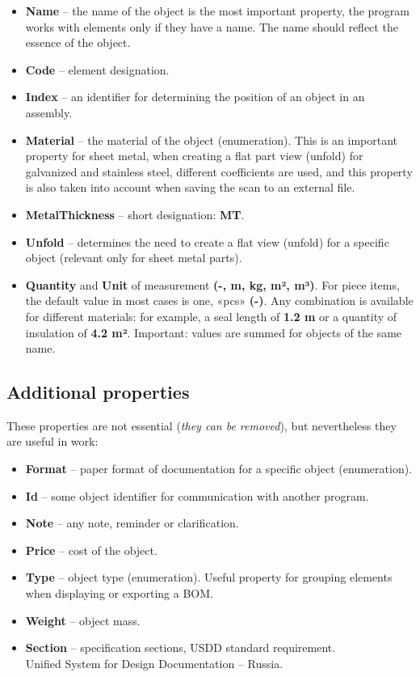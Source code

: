 \documentclass[a4paper,12pt]{article}
\begin{document}
\begin{itemize}
	\item \textbf{Name} -- the name of the object is the most important property, the program works with elements only if they have a name. The name should reflect the essence of the object.
	\item \textbf{Code} -- element designation.
	\item \textbf{Index} -- an identifier for determining the position of an object in an assembly.
	\item \textbf{Material} -- the material of the object (enumeration). This is an important property for sheet metal, when creating a flat part view (unfold) for galvanized and stainless steel, different coefficients are used, and this property is also taken into account when saving the scan to an external file.
	\item \textbf{MetalThickness} -- short designation: \textbf{MT}.
	\item \textbf{Unfold} -- determines the need to create a flat view (unfold) for a specific object (relevant only for sheet metal parts).
	\item \textbf{Quantity} and \textbf{Unit} of measurement \textbf{(-, m, kg, m², m³)}. For piece items, the default value in most cases is one, «pcs» \textbf{(-)}. Any combination is available for different materials: for example, a seal length of \textbf{1.2 m} or a quantity of insulation of \textbf{4.2 m²}. Important: values ​​are summed for objects of the same name.
\end{itemize}

\pagebreak

\subsection{Additional properties}

These properties are not essential (\emph{they can be removed}), but nevertheless they are useful in work:

\begin{itemize}
	\item \textbf{Format} -- paper format of documentation for a specific object (enumeration).
	\item \textbf{Id} -- some object identifier for communication with another program.
	\item \textbf{Note} -- any note, reminder or clarification.
	\item \textbf{Price} -- cost of the object.
	\item \textbf{Type} -- object type (enumeration). Useful property for grouping elements when displaying or exporting a BOM.
	\item \textbf{Weight} -- object mass.
	\item \textbf{Section} -- specification sections, USDD standard requirement.\\Unified System for Design Documentation -- Russia.
\end{itemize}
\end{document}
